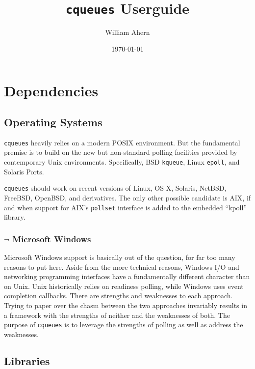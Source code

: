 \documentclass[11pt, oneside]{memoir}
\newcommand*{\cqueues}[0]{\texttt{cqueues}\xspace}
\newcommand*{\syscall}[1]{\texttt{#1}\xspace}
\begin{document}
\title{\cqueues Userguide}
\date{\today}
\author{William Ahern}
\maketitle

\tableofcontents
\clearpage
\setcounter{page}{1}

\chapter{Dependencies}

\section{Operating Systems}

\cqueues heavily relies on a modern POSIX environment. But the fundamental premise is to build on the new but non-standard polling facilities provided by contemporary Unix environments. Specifically, BSD \syscall{kqueue}, Linux \syscall{epoll}, and Solaris Ports.

\cqueues should work on recent versions of Linux, OS X, Solaris, NetBSD, FreeBSD, OpenBSD, and derivatives. The only other possible candidate is AIX, if and when support for AIX's \syscall{pollset} interface is added to the embedded ``kpoll'' library.

\subsection{$\lnot$ Microsoft Windows}

Microsoft Windows support is basically out of the question, for far too many reasons to put here. Aside from the more technical reasons, Windows I/O and networking programming interfaces have a fundamentally different character than on Unix. Unix historically relies on readiness polling, while Windows uses event completion callbacks. There are strengths and weaknesses to each approach. Trying to paper over the chasm between the two approaches invariably results in a framework with the strengths of neither and the weaknesses of both. The purpose of \cqueues is to leverage the strengths of polling as well as address the weaknesses.

\section{Libraries}
\end{document}
